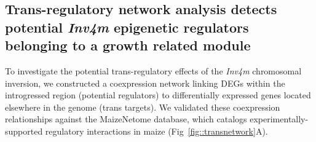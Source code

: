 \documentclass[9pt,twocolumn,twoside]{rilabRxiv}
\newcommand{\invfour}{\textit{Inv4m}\xspace}
\newcommand{\jmjii}{\textit{jmj2}\xspace}
\newcommand{\jmjiv}{\textit{jmj4}\xspace}
\begin{document}


\subsection{Trans-regulatory network analysis detects potential \invfour epigenetic regulators belonging to a growth related module }

To investigate the potential trans-regulatory effects of the \invfour chromosomal inversion, we constructed a coexpression network linking DEGs within the introgressed region (potential regulators) to differentially expressed genes located elsewhere in the genome (trans targets).
We validated these coexpression relationships against the MaizeNetome database, which catalogs experimentally-supported regulatory interactions in maize (Fig~\ref{fig::transnetwork}A).
\end{document}
